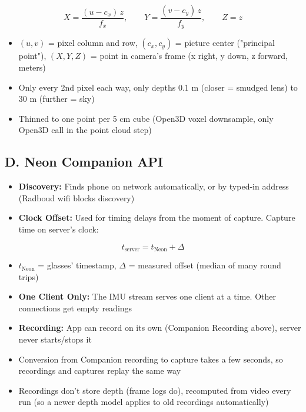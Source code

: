 \documentclass[a4paper]{article}
\begin{document}
$$X = \frac{(u - c_x)\, z}{f_x}, \qquad Y = \frac{(v - c_y)\, z}{f_y}, \qquad Z = z$$

\begin{itemize}
	\item $(u, v)$ = pixel column and row, $(c_x, c_y)$ = picture center ("principal point"), $(X, Y, Z)$ = point in camera's frame (x right, y down, z forward, meters)
	\item Only every 2nd pixel each way, only depths 0.1 m (closer = smudged lens) to 30 m (further = sky)
	\item Thinned to one point per 5 cm cube (Open3D voxel downsample, only Open3D call in the point cloud step)
\end{itemize}

\subsection{D. Neon Companion API} \label{d-neon-companion-api}
\begin{itemize}
	\item \textbf{Discovery:} Finds phone on network automatically, or by typed-in address (Radboud wifi blocks discovery)
	\item \textbf{Clock Offset:} Used for timing delays from the moment of capture. Capture time on server's clock:
\end{itemize}

  $$t_{\text{server}} = t_{\text{Neon}} + \Delta$$

\begin{itemize}  
	\item $t_{\text{Neon}}$ = glasses' timestamp, $\Delta$ = measured offset (median of many round trips)
	\item \textbf{One Client Only:} The IMU stream serves one client at a time. Other connections get empty readings
	\item \textbf{Recording:} App can record on its own (Companion Recording above), server never starts/stops it
	\item Conversion from Companion recording to capture takes a few seconds, so recordings and captures replay the same way
	\item Recordings don't store depth (frame logs do), recomputed from video every run (so a newer depth model applies to old recordings automatically)
\end{itemize}
\end{document}
